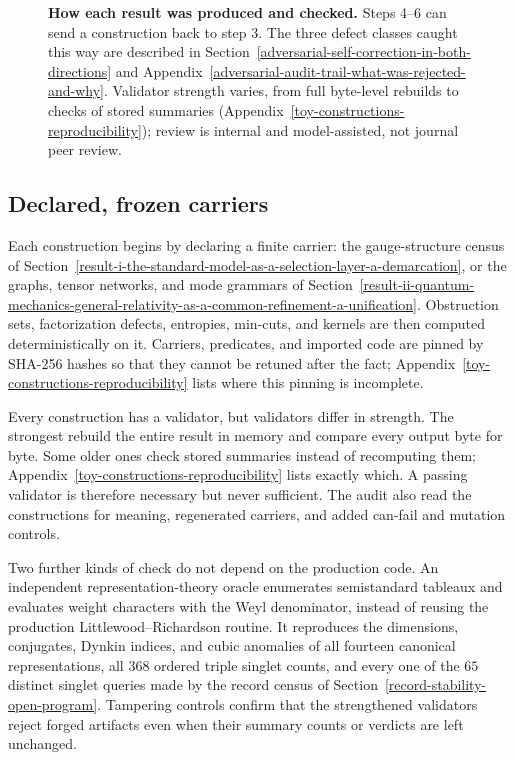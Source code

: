 \documentclass[11pt]{article}
\theoremstyle{definition}
\begin{document}
\begin{figure}[tbp]
\caption{\textbf{How each result was produced and checked.} Steps 4--6 can send a construction back to step 3. The
three defect classes caught this way are described in Section~\ref{adversarial-self-correction-in-both-directions} and
Appendix~\ref{adversarial-audit-trail-what-was-rejected-and-why}. Validator strength varies, from full byte-level
rebuilds to checks of stored summaries (Appendix~\ref{toy-constructions-reproducibility}); review is internal and
model-assisted, not journal peer review.}
\label{fig:pipeline}
\end{figure}
 
\subsection{Declared, frozen carriers}\label{finite-frozen-carriers}

Each construction begins by declaring a finite carrier: the gauge-structure census of
Section~\ref{result-i-the-standard-model-as-a-selection-layer-a-demarcation}, or the graphs, tensor networks, and
mode grammars of Section~\ref{result-ii-quantum-mechanics-general-relativity-as-a-common-refinement-a-unification}.
Obstruction sets, factorization defects, entropies, min-cuts, and kernels are then computed deterministically on it.
Carriers, predicates, and imported code are pinned by SHA-256 hashes so that they cannot be retuned after the fact;
Appendix~\ref{toy-constructions-reproducibility} lists where this pinning is incomplete.

Every construction has a validator, but validators differ in strength. The strongest rebuild the entire result in
memory and compare every output byte for byte. Some older ones check stored summaries instead of recomputing them;
Appendix~\ref{toy-constructions-reproducibility} lists exactly which. A passing validator is therefore necessary but
never sufficient. The audit also read the constructions for meaning, regenerated carriers, and added can-fail and
mutation controls.

Two further kinds of check do not depend on the production code. An independent representation-theory oracle
enumerates semistandard tableaux and evaluates weight characters with the Weyl denominator, instead of reusing the
production Littlewood--Richardson routine. It reproduces the dimensions, conjugates, Dynkin indices, and cubic anomalies
of all fourteen canonical representations, all \(368\) ordered triple singlet counts, and every one of the \(65\)
distinct singlet queries made by the record census of Section~\ref{record-stability-open-program}. Tampering controls
confirm that the strengthened validators reject forged artifacts even when their summary counts or verdicts are left
unchanged.
\end{document}
